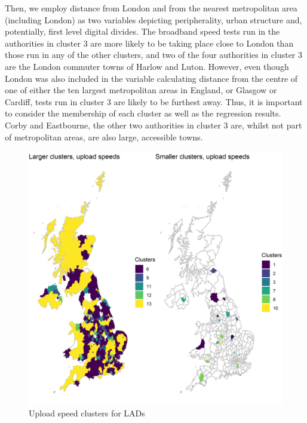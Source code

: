 \documentclass[Royal,times,sageh]{sagej}
\begin{document}
Then, we employ distance from London and from the nearest metropolitan
area (including London) as two variables depicting peripherality, urban
structure and, potentially, first level digital divides. The broadband
speed tests run in the authorities in cluster \(3\) are more likely to
be taking place close to London than those run in any of the other
clusters, and two of the four authorities in cluster \(3\) are the
London commuter towns of Harlow and Luton. However, even though London
was also included in the variable calculating distance from the centre
of one of either the ten largest metropolitan areas in England, or
Glasgow or Cardiff, tests run in cluster \(3\) are likely to be furthest
away. Thus, it is important to consider the membership of each cluster
as well as the regression results. Corby and Eastbourne, the other two
authorities in cluster \(3\) are, whilst not part of metropolitan areas,
are also large, accessible towns.

\begin{figure}
\includegraphics[width=0.95\linewidth]{figures/map.up.clusters} \caption{\label{map.up.clusters}Upload speed clusters for LADs}\label{fig:unnamed-chunk-6}
\end{figure}
\end{document}
